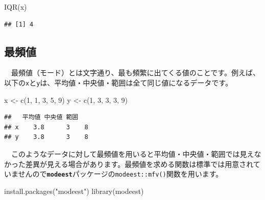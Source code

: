 \documentclass[
  12pt,
]{book}
\newenvironment{Shaded}{\begin{snugshade}}{\end{snugshade}}
\newcommand{\DecValTok}[1]{\textcolor[rgb]{0.00,0.00,0.81}{#1}}
\newcommand{\FunctionTok}[1]{\textcolor[rgb]{0.00,0.00,0.00}{#1}}
\newcommand{\NormalTok}[1]{#1}
\newcommand{\OtherTok}[1]{\textcolor[rgb]{0.56,0.35,0.01}{#1}}
\newcommand{\StringTok}[1]{\textcolor[rgb]{0.31,0.60,0.02}{#1}}
\begin{document}
\begin{Shaded}
\begin{Highlighting}[numbers=left,,]
\FunctionTok{IQR}\NormalTok{(x)}
\end{Highlighting}
\end{Shaded}

\begin{verbatim}
## [1] 4
\end{verbatim}

\newpage

\hypertarget{ux6700ux983bux5024}{%
\subsection{\texorpdfstring{最頻値}{最頻値}}\label{ux6700ux983bux5024}}

　最頻値（モード）とは文字通り、最も頻繁に出てくる値のことです。例えば、以下の\texttt{x}と\texttt{y}は、平均値・中央値・範囲は全て同じ値になるデータです。

\begin{Shaded}
\begin{Highlighting}[numbers=left,,]
\NormalTok{x }\OtherTok{\textless{}{-}} \FunctionTok{c}\NormalTok{(}\DecValTok{1}\NormalTok{, }\DecValTok{1}\NormalTok{, }\DecValTok{3}\NormalTok{, }\DecValTok{5}\NormalTok{, }\DecValTok{9}\NormalTok{)}
\NormalTok{y }\OtherTok{\textless{}{-}} \FunctionTok{c}\NormalTok{(}\DecValTok{1}\NormalTok{, }\DecValTok{3}\NormalTok{, }\DecValTok{3}\NormalTok{, }\DecValTok{3}\NormalTok{, }\DecValTok{9}\NormalTok{)}
\end{Highlighting}
\end{Shaded}

\begin{verbatim}
##   平均値 中央値 範囲
## x    3.8      3    8
## y    3.8      3    8
\end{verbatim}

　このようなデータに対して最頻値を用いると平均値・中央値・範囲では見えなかった差異が見える場合があります。最頻値を求める関数は標準では用意されていませんので\textbf{\texttt{modeest}}パッケージ\citep{R-modeest}の\texttt{modeest::mfv()}関数を用います。

\begin{Shaded}
\begin{Highlighting}[numbers=left,,]
\FunctionTok{install.packages}\NormalTok{(}\StringTok{"modeest"}\NormalTok{)}
\FunctionTok{library}\NormalTok{(modeest)}
\end{Highlighting}
\end{Shaded}
\end{document}
